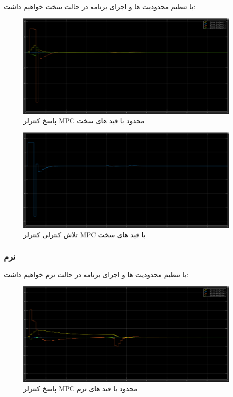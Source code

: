 با تنظیم محدودیت ها و اجرای برنامه در حالت سخت خواهیم داشت:
\begin{figure}[H]
	\centering
	\includegraphics[width=1\linewidth]{../img/Q4_Hard_Output}
	\caption{پاسخ کنترلر MPC محدود با قید های سخت}
	\label{fig:q4hardoutput}
\end{figure}

\begin{figure}[H]
	\centering
	\includegraphics[width=1\linewidth]{../img/Q4_Hard_control_effort}
	\caption{تلاش کنترلی کنترلر MPC با قید های سخت}
	\label{fig:q4hardcontroleffort}
\end{figure}

\subsubsection{نرم}
با تنظیم محدودیت ها و اجرای برنامه در حالت نرم خواهیم داشت:
\begin{figure}[H]
	\centering
	\includegraphics[width=1\linewidth]{../img/Q4_Soft_output}
	\caption{پاسخ کنترلر MPC محدود با قید های نرم}
	\label{fig:q4softoutput}
\end{figure}

